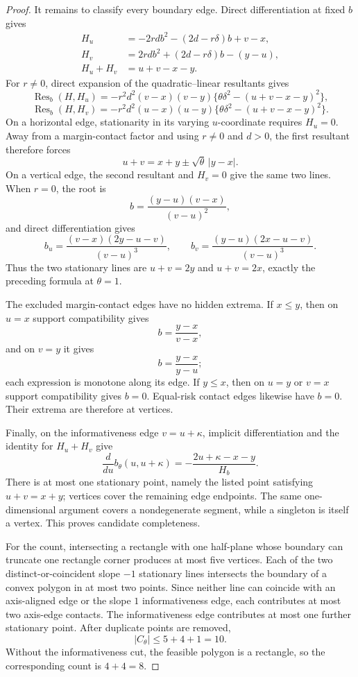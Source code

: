 \documentclass{article}
\begin{document}
\begin{proof}
It remains to classify every boundary edge. Direct differentiation at fixed \(b\) gives
\[
\begin{aligned}
H_u&=-2rdb^2-(2d-r\delta)b+v-x,\\
H_v&= 2rdb^2+(2d-r\delta)b-(y-u),\\
H_u+H_v&=u+v-x-y.
\end{aligned}
\]
For \(r\neq0\), direct expansion of the quadratic--linear resultants gives
\[
\operatorname{Res}_b(H,H_u)
=-r^2d^2(v-x)(v-y)
\{\theta\delta^2-(u+v-x-y)^2\},
\]
\[
\operatorname{Res}_b(H,H_v)
=-r^2d^2(u-x)(u-y)
\{\theta\delta^2-(u+v-x-y)^2\}.
\]
On a horizontal edge, stationarity in its varying \(u\)-coordinate requires \(H_u=0\). Away from a margin-contact factor and using \(r\neq0\) and \(d>0\), the first resultant therefore forces
\[
u+v=x+y\pm\sqrt\theta\,|y-x|.
\]
On a vertical edge, the second resultant and \(H_v=0\) give the same two lines. When \(r=0\), the root is
\[
b=\frac{(y-u)(v-x)}{(v-u)^2},
\]
and direct differentiation gives
\[
b_u=\frac{(v-x)(2y-u-v)}{(v-u)^3},
\qquad
b_v=\frac{(y-u)(2x-u-v)}{(v-u)^3}.
\]
Thus the two stationary lines are \(u+v=2y\) and \(u+v=2x\), exactly the preceding formula at \(\theta=1\).

The excluded margin-contact edges have no hidden extrema. If \(x\leq y\), then on \(u=x\) support compatibility gives
\[
b=\frac{y-x}{v-x},
\]
and on \(v=y\) it gives
\[
b=\frac{y-x}{y-u};
\]
each expression is monotone along its edge. If \(y\leq x\), then on \(u=y\) or \(v=x\) support compatibility gives \(b=0\). Equal-risk contact edges likewise have \(b=0\). Their extrema are therefore at vertices.

Finally, on the informativeness edge \(v=u+\kappa\), implicit differentiation and the identity for \(H_u+H_v\) give
\[
\frac{d}{du}b_\theta(u,u+\kappa)
=-\frac{2u+\kappa-x-y}{H_b}.
\]
There is at most one stationary point, namely the listed point satisfying \(u+v=x+y\); vertices cover the remaining edge endpoints. The same one-dimensional argument covers a nondegenerate segment, while a singleton is itself a vertex. This proves candidate completeness.

For the count, intersecting a rectangle with one half-plane whose boundary can truncate one rectangle corner produces at most five vertices. Each of the two distinct-or-coincident slope \(-1\) stationary lines intersects the boundary of a convex polygon in at most two points. Since neither line can coincide with an axis-aligned edge or the slope \(1\) informativeness edge, each contributes at most two axis-edge contacts. The informativeness edge contributes at most one further stationary point. After duplicate points are removed,
\[
|C_\theta|\leq5+4+1=10.
\]
Without the informativeness cut, the feasible polygon is a rectangle, so the corresponding count is \(4+4=8\).


\end{proof}
\end{document}
